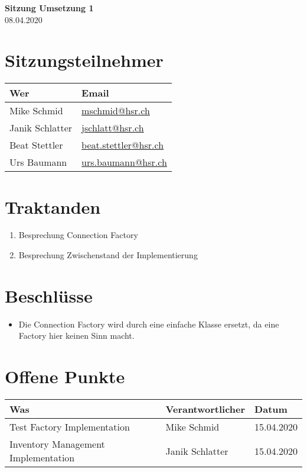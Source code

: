 \documentclass[
	ngerman,
	toc=listof, %
	toc=bibliography, %
	footnotes=multiple, %
	parskip=half, %
	numbers=noendperiod %
]{scrartcl}
\newcommand{\titel}{Sitzung Umsetzung 1}
\newcommand{\datum}{08.04.2020}
\begin{document}
\begin{center}
    \LARGE \textbf{\titel} \\[2ex]
    \large \datum \\[2ex]
\end{center}

\section*{Sitzungsteilnehmer}
\begin{tabularx}{0.9\linewidth}{Xl}
	\toprule
	Wer & Email \\
	\midrule
	Mike Schmid & \scriptsize \url{mschmid@hsr.ch} \\
	Janik Schlatter & \scriptsize \url{jschlatt@hsr.ch} \\
	Beat Stettler & \scriptsize \url{beat.stettler@hsr.ch} \\
	Urs Baumann & \scriptsize \url{urs.baumann@hsr.ch} \\
	\bottomrule
\end{tabularx}

\section*{Traktanden}
\begin{enumerate}
	\item Besprechung Connection Factory
	\item Besprechung Zwischenstand der Implementierung
\end{enumerate}

\section*{Beschlüsse}
	\begin{itemize}
		\item Die Connection Factory wird durch eine einfache Klasse ersetzt, da eine Factory hier keinen Sinn macht.
	\end{itemize}

\section*{Offene Punkte}
\begin{tabularx}{0.9\linewidth}{Xll}
	\toprule
	Was & Verantwortlicher & Datum \\
	\midrule
	 Test Factory Implementation & Mike Schmid & 15.04.2020 \\
	 Inventory Management Implementation & Janik Schlatter & 15.04.2020 \\
	\bottomrule
\end{tabularx}
\end{document}
